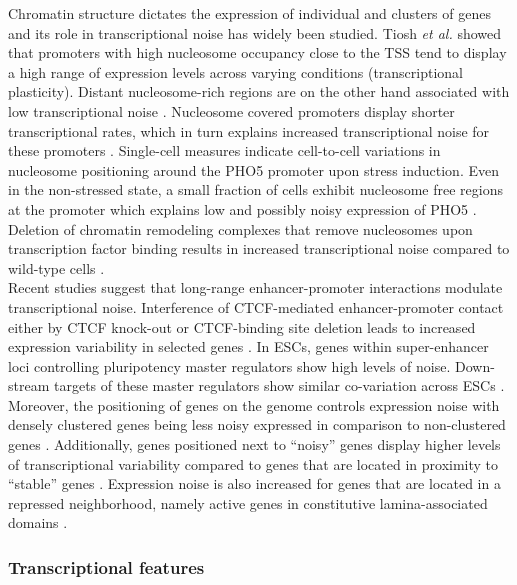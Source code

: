 Chromatin structure dictates the expression of individual and clusters of genes and its role in transcriptional noise has widely been studied. Tiosh \textit{et al.} showed that promoters with high nucleosome occupancy close to the TSS tend to display a high range of expression levels across varying conditions (transcriptional plasticity). Distant nucleosome-rich regions are on the other hand associated with low transcriptional noise \citep{Tirosh2008}. Nucleosome covered promoters display shorter transcriptional rates, which in turn explains increased transcriptional noise for these promoters \cite{Dey2015}. Single-cell measures indicate cell-to-cell variations in nucleosome positioning around the PHO5 promoter upon stress induction. Even in the non-stressed state, a small fraction of cells exhibit nucleosome free regions at the promoter which explains low and possibly noisy expression of PHO5 \citep{Small2014}. Deletion of chromatin remodeling complexes that remove nucleosomes upon transcription factor binding results in increased transcriptional noise compared to wild-type cells \citep{Raser2004}. \\ 
Recent studies suggest that long-range enhancer-promoter interactions modulate transcriptional noise. Interference of CTCF-mediated enhancer-promoter contact either by CTCF knock-out or CTCF-binding site deletion leads to increased expression variability in selected genes \citep{Ren2017}. In ESCs, genes within super-enhancer loci controlling pluripotency master regulators show high levels of noise. Down-stream targets of these master regulators show similar co-variation across ESCs \citep{Faure2017}.\\
Moreover, the positioning of genes on the genome controls expression noise with densely clustered genes being less noisy expressed in comparison to non-clustered genes \citep{Kustatscher2017}. Additionally, genes positioned next to “noisy” genes display higher levels of transcriptional variability compared to genes that are located in proximity to “stable” genes \citep{Kar2017}. Expression noise is also increased for genes that are located in a repressed neighborhood, namely active genes in constitutive lamina-associated domains \citep{Faure2017}. 

\subsubsection{Transcriptional features}

